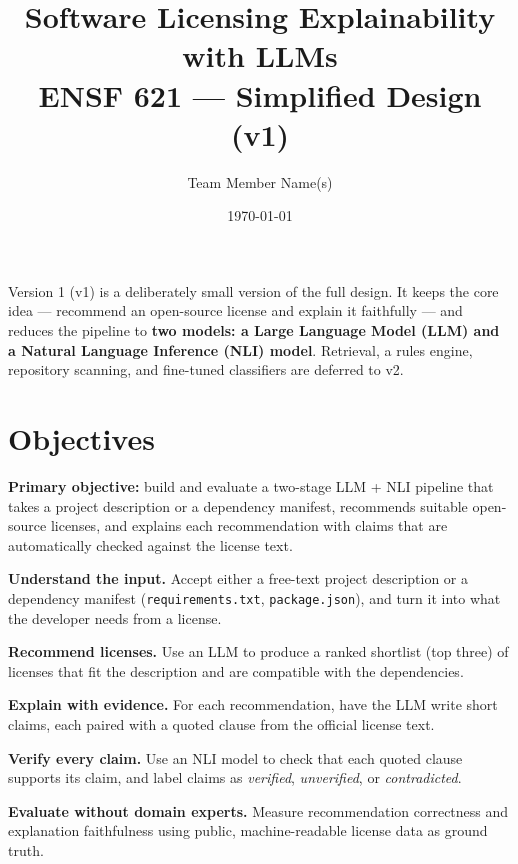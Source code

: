 \documentclass[11pt]{article}
\title{\textbf{Software Licensing Explainability with LLMs}\\[4pt]
\large ENSF 621 --- Simplified Design (v1)}
\author{Team Member Name(s)}
\date{\today}
\begin{document}
\maketitle

\noindent
Version 1 (v1) is a deliberately small version of the full design. It keeps the core idea --- recommend an open-source license and explain it faithfully --- and reduces the pipeline to \textbf{two models: a Large Language Model (LLM) and a Natural Language Inference (NLI) model}. Retrieval, a rules engine, repository scanning, and fine-tuned classifiers are deferred to v2.

\section{Objectives}

\textbf{Primary objective:} build and evaluate a two-stage LLM + NLI pipeline that takes a project description or a dependency manifest, recommends suitable open-source licenses, and explains each recommendation with claims that are automatically checked against the license text.

\begin{description}[leftmargin=1.2cm,style=nextline]
  \item[O1] \textbf{Understand the input.} Accept either a free-text project description or a dependency manifest (\texttt{requirements.txt}, \texttt{package.json}), and turn it into what the developer needs from a license.
  \item[O2] \textbf{Recommend licenses.} Use an LLM to produce a ranked shortlist (top three) of licenses that fit the description and are compatible with the dependencies.
  \item[O3] \textbf{Explain with evidence.} For each recommendation, have the LLM write short claims, each paired with a quoted clause from the official license text.
  \item[O4] \textbf{Verify every claim.} Use an NLI model to check that each quoted clause supports its claim, and label claims as \emph{verified}, \emph{unverified}, or \emph{contradicted}.
  \item[O5] \textbf{Evaluate without domain experts.} Measure recommendation correctness and explanation faithfulness using public, machine-readable license data as ground truth.
\end{description}
\end{document}

